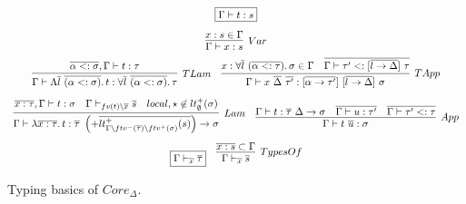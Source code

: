 \documentclass[11pt]{article}
\newcommand{\mathframebox}[1]{\framebox{$\displaystyle #1$}}
\newcommand{\ap}{~}
\begin{document}
    \begin{figure}
        \begin{gather*}
            \mathframebox{\Gamma\vdash t : s} \\[0.5em]
            \infer[Var]{\Gamma\vdash x : s}{x : s \in \Gamma} \\
            \begin{array}{cc}
                \infer[TLam]{
                    \Gamma\vdash\Lambda\overline{l}\ap\overline{(\alpha <: \sigma)}\ldotp t : \forall\overline{l}\ap\overline{(\alpha <: \sigma)}\ldotp\tau
                }{
                    \overline{\alpha <: \sigma}, \Gamma\vdash t : \tau
                } &
                \infer[TApp]{
                    \Gamma\vdash x\ap\overline{\Delta}\ap\overline{\tau'} : [\overline{\alpha\to\tau'}]\ap[\overline{l\to\Delta}]\ap\sigma
                }{
                    x : \forall\overline{l}\ap(\overline{\alpha <: \tau})\ldotp \sigma \in \Gamma
                    &
                    \overline{\Gamma\vdash\tau' <: [\overline{l\to\Delta}]\ap\tau}
                }
            \end{array} \\[0.5em]
            \begin{array}{cc}
                \infer[Lam]{
                    \Gamma\vdash \lambda \overline{x : \tau} \ldotp t :  \overline{\tau}~ \left(+\overline{lt_{\Gamma\setminus ftv^-(\overline{\tau}) \setminus ftv^+(\sigma)}^+(s)}\right) \to \sigma
                }{
                    \overline{x : \tau}, \Gamma\vdash t : \sigma
                    &
                    \Gamma\vdash_{fv(t)\setminus \overline{x}}\overline{s}
                    &
                    local, \star \not\in lt_\emptyset^+(\sigma)
                } &
                \infer[App]{
                    \Gamma\vdash t \ap \overline{u} : \sigma
                } {
                    \Gamma\vdash t : \overline{\tau}~\Delta\to\sigma
                    &
                    \overline{\Gamma\vdash u : \tau'}
                    &
                    \overline{\Gamma\vdash\tau' <: \tau}
                }
            \end{array} \\[0.5em]
            \begin{array}{cc}
                \mathframebox{\Gamma\vdash_{\overline{x}}\overline{\tau}} &
                \infer[TypesOf]{\Gamma\vdash_{\overline{x}}\overline{s}}{\overline{x : s} \subset \Gamma}
            \end{array}
        \end{gather*}
        \caption{Typing basics of $Core_\Delta$.}
        \label{fig:core-functions}
    \end{figure}
\end{document}
